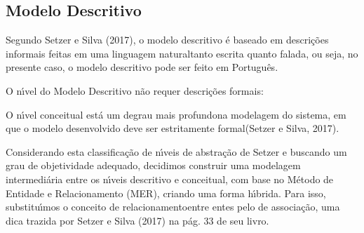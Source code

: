 \documentclass[
12pt,		%
openright,	%
twoside,  %
a4paper,			%
chapter=TITLE,		%
english,			%
french,				%
spanish,			%
brazil				%
]{USPSC-classe/USPSC}
\begin{document}
\subsection[Modelo Descritivo]{Modelo Descritivo}\label{Modelo Descritivo}
Segundo Setzer e Silva (2017), o modelo descritivo \'e baseado em \textquotedbl descri\c{c}\~oes informais feitas em uma linguagem natural\textquotedbl  tanto escrita quanto falada, ou seja, no presente caso, o modelo descritivo pode ser feito em Portugu\^es.














O n\'{\i}vel do Modelo Descritivo n\~ao requer descri\c{c}\~oes formais:















\noindent\begin{center}\mbox{\centering{}}\end{center}


O n\'{\i}vel conceitual est\'a \textquotedbl um degrau mais profundo\textquotedbl  na modelagem do sistema, em que \textquotedbl o modelo desenvolvido deve ser estritamente formal\textquotedbl  (Setzer e Silva, 2017).














Considerando esta classifica\c{c}\~ao de n\'{\i}veis de abstra\c{c}\~ao de Setzer e buscando um grau de objetividade adequado, decidimos construir uma modelagem intermedi\'aria entre os n\'{\i}veis descritivo e conceitual, com base no M\'etodo de Entidade e Relacionamento (MER), criando uma forma h\'{\i}brida. Para isso, substitu\'{\i}mos o conceito de \textquotedbl relacionamento\textquotedbl  entre entes pelo de \textquotedbl associa\c{c}\~ao\textquotedbl , uma dica trazida por  Setzer e Silva (2017) na p\'ag. 33 de seu livro.
\end{document}
